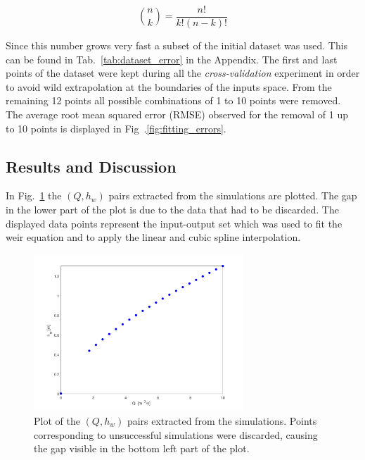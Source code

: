 \begin{equation}
  \binom{n}{k} = \frac{n!}{k!\left(n-k\right)!}
\end{equation}

\noindent Since this number grows very fast a subset of the initial dataset was used.
This can be found in Tab.~\ref{tab:dataset_error} in the Appendix.
The first and last points of the dataset were kept during all the \emph{cross-validation} experiment in order to avoid wild extrapolation at the boundaries of the inputs space.
From the remaining \num{12} points all possible combinations of \num{1} to \num{10} points were removed.
The average root mean squared error (RMSE) observed for the removal of \num{1} up to \num{10} points is displayed in Fig~.\ref{fig:fitting_errors}.

\subsection{Results and Discussion}


In Fig.~\ref{fig:simulations_results} the $(Q, h_w)$ pairs extracted from the simulations are plotted.
The gap in the lower part of the plot is due to the data that had to be discarded.
The displayed data points represent the input-output set which was used to fit the weir equation and to apply the  linear and cubic spline interpolation.

\begin{figure}[h]
  \centering
  \includegraphics[width=0.7\textwidth]{Figures/simulations_results.png}
  \caption{Plot of the $(Q, h_w)$ pairs extracted from the simulations. Points corresponding to unsuccessful simulations were discarded, causing the gap visible in the bottom left part of the plot.}
  \label{fig:simulations_results}
\end{figure}

